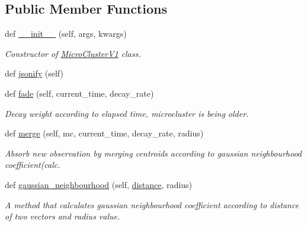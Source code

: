 \subsection*{Public Member Functions}
\begin{DoxyCompactItemize}
\item 
def \hyperlink{classStreamClusteringAlgorithms_1_1evoStream_1_1v1_1_1Classes_1_1MicroClusterV1_1_1MicroClusterV1_a535fe276e2ea722b7526df2b0c7a816d}{\+\_\+\+\_\+init\+\_\+\+\_\+} (self, args, kwargs)
\begin{DoxyCompactList}\small\item\em Constructor of \hyperlink{classStreamClusteringAlgorithms_1_1evoStream_1_1v1_1_1Classes_1_1MicroClusterV1_1_1MicroClusterV1}{Micro\+Cluster\+V1} class. \end{DoxyCompactList}\item 
def \hyperlink{classStreamClusteringAlgorithms_1_1evoStream_1_1v1_1_1Classes_1_1MicroClusterV1_1_1MicroClusterV1_a96848a3f344c55417c2372c96927314c}{jsonify} (self)
\item 
def \hyperlink{classStreamClusteringAlgorithms_1_1evoStream_1_1v1_1_1Classes_1_1MicroClusterV1_1_1MicroClusterV1_ad0bb09e1ba3f158c47ba7712d5c18b72}{fade} (self, current\+\_\+time, decay\+\_\+rate)
\begin{DoxyCompactList}\small\item\em Decay weight according to elapsed time, microcluster is being older. \end{DoxyCompactList}\item 
def \hyperlink{classStreamClusteringAlgorithms_1_1evoStream_1_1v1_1_1Classes_1_1MicroClusterV1_1_1MicroClusterV1_a6eab40d474343e74a914eaa3d341e7d6}{merge} (self, mc, current\+\_\+time, decay\+\_\+rate, radius)
\begin{DoxyCompactList}\small\item\em Absorb new observation by merging centroids according to gaussian neighbourhood coefficient(calc. \end{DoxyCompactList}\item 
def \hyperlink{classStreamClusteringAlgorithms_1_1evoStream_1_1v1_1_1Classes_1_1MicroClusterV1_1_1MicroClusterV1_ad9fd1f97aca72cc3f82e72e2a910932e}{gaussian\+\_\+neighbourhood} (self, \hyperlink{classStreamClusteringAlgorithms_1_1evoStream_1_1v1_1_1Classes_1_1MicroClusterV1_1_1MicroClusterV1_ab8516e0a725a95e796becd032401ddc1}{distance}, radius)
\begin{DoxyCompactList}\small\item\em A method that calculates gaussian neighbourhood coefficient according to distance of two vectors and radius value. \end{DoxyCompactList}\item 

\end{DoxyCompactItemize}
